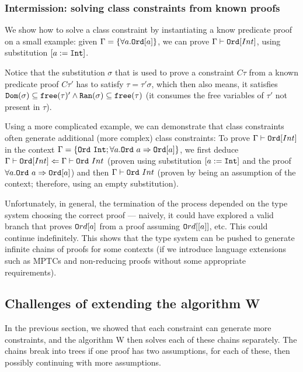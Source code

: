 \subsubsection{Intermission: solving class constraints from known proofs}

We show how to solve a class constraint by instantiating a know predicate proof on a small example: given $\Gamma = \{\forall a . \mathtt{Ord} [a]\}$, we can prove $\Gamma \vdash \mathtt{Ord} [Int]$, using substitution $[a := \mathtt{Int}]$. \cite{jones1999typing}

Notice that the substitution $\sigma$ that is used to prove a constraint $C \tau$ from a known predicate proof $C \tau'$ has to satisfy $\tau = \tau' \sigma$, which then also means, it satisfies $\mathtt{Dom} (\sigma) \subseteq \mathtt{free} (\tau)' \land \mathtt{Ran} (\sigma) \subseteq \mathtt{free} (\tau)$ (it consumes the free variables of $\tau'$ not present in $\tau$).

Using a more complicated example, we can demonstrate that class constraints often generate additional (more complex) class constraints: To prove $\Gamma \vdash \mathtt{Ord} [Int]$ in the context $\Gamma = \{\mathtt{Ord}\ \mathtt{Int}; \forall a . \mathtt{Ord}\ a \Rightarrow \mathtt{Ord} [a]\}$, we first deduce $\Gamma \vdash \mathtt{Ord} [Int] \Leftarrow \Gamma \vdash \mathtt{Ord}\ Int$ (proven using substitution $[a := \mathtt{Int}]$ and the proof $\forall a . \mathtt{Ord}\ a \Rightarrow \mathtt{Ord} [a]$) and then $\Gamma \vdash \mathtt{Ord}\ Int$ (proven by being an assumption of the context; therefore, using an empty substitution).

Unfortunately, in general, the termination of the process depended on the type system choosing the correct proof --- naively, it could have explored a valid branch that proves $\mathtt{O}rd [a]$ from a proof assuming $\mathtt{O}rd [[a]]$, etc. This could continue indefinitely. This shows that the type system can be pushed to generate infinite chains of proofs for some contexts (if we introduce language extensions such as MPTCs and non-reducing proofs without some appropriate requirements).

\subsection{Challenges of extending the algorithm W}

In the previous section, we showed that each constraint can generate more constraints, and the algorithm W then solves each of these chains separately. The chains break into trees if one proof has two assumptions, for each of these, then possibly continuing with more assumptions.

